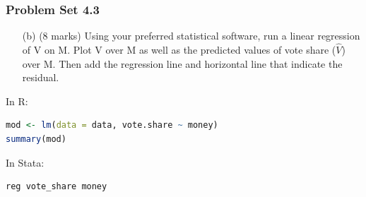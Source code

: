 \documentclass[xcolor=table]{beamer}
\begin{document}

\begin{frame}[fragile]
\frametitle{Problem Set 4.3}
\begin{enumerate}
\item[(b)] (8 marks) Using your preferred statistical software, run a linear regression of V on M. \pause Plot V over M as well as the predicted values of vote share ($\hat{V}$) over M. Then add the regression line and horizontal line that indicate the residual. 
\end{enumerate} \pause In R: 
\begin{lstlisting}[language = R]
mod <- lm(data = data, vote.share ~ money)
summary(mod)
\end{lstlisting} \pause

In Stata: 
\begin{lstlisting}
reg vote_share money
\end{lstlisting} 
\end{frame}
\end{document}
